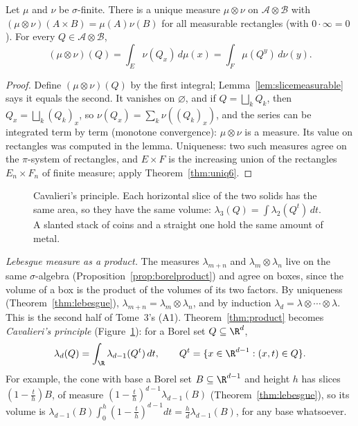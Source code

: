 \begin{theorem}\label{thm:product}
Let $\mu$ and $\nu$ be $\sigma$-finite. There is a unique measure $\mu\otimes\nu$ on $\mathcal A\otimes\mathcal B$ with $(\mu\otimes\nu)(A\times B)=\mu(A)\nu(B)$ for all measurable rectangles (with $0\cdot\infty=0$). For every
$Q\in\mathcal A\otimes\mathcal B$,
\[(\mu\otimes\nu)(Q)=\int_E\nu(Q_x)\,d\mu(x)=\int_F\mu(Q^y)\,d\nu(y).\]
\end{theorem}
\begin{proof}
Define $(\mu\otimes\nu)(Q)$ by the first integral; Lemma~\ref{lem:slicemeasurable} says it equals the second. It vanishes on $\varnothing$, and if $Q=\bigsqcup_kQ_k$, then $Q_x=\bigsqcup_k(Q_k)_x$, so
$\nu(Q_x)=\sum_k\nu((Q_k)_x)$, and the series can be integrated term by term (monotone convergence): $\mu\otimes\nu$ is a measure. Its value on rectangles was computed in the lemma. Uniqueness: two such
measures agree on the $\pi$-system of rectangles, and $E\times F$ is the increasing union of the rectangles $E_n\times F_n$ of finite measure; apply Theorem~\ref{thm:uniq6}.
\end{proof}

\begin{figure}[ht]
\centering
{}
\caption{Cavalieri's principle. Each horizontal slice of the two solids has the same area, so they have the same volume:
$\lambda_3(Q)=\int\lambda_2(Q^t)\,dt$. A slanted stack of coins and a straight one hold the same amount of metal.}
\label{fig:cavalieri}
\end{figure}

\emph{Lebesgue measure as a product.} The measures $\lambda_{m+n}$ and $\lambda_m\otimes\lambda_n$ live on the same $\sigma$-algebra (Proposition~\ref{prop:borelproduct}) and agree on boxes, since the volume of a box is the
product of the volumes of its two factors. By uniqueness (Theorem~\ref{thm:lebesgue}), $\lambda_{m+n}=\lambda_m\otimes\lambda_n$, and by induction $\lambda_d=\lambda\otimes\cdots\otimes\lambda$. This is the second
half of Tome~3's (A1). Theorem~\ref{thm:product} becomes \emph{Cavalieri's principle} (Figure~\ref{fig:cavalieri}): for a Borel set $Q\subseteq\R^d$,
\[\lambda_d(Q)=\int_\R\lambda_{d-1}(Q^t)\,dt,\qquad Q^t=\{x\in\R^{d-1}:(x,t)\in Q\}.\]
For example, the cone with base a Borel set $B\subseteq\R^{d-1}$ and height $h$ has slices $(1-\frac th)B$, of measure $(1-\frac th)^{d-1}\lambda_{d-1}(B)$ (Theorem~\ref{thm:lebesgue}), so its volume is
$\lambda_{d-1}(B)\int_0^h(1-\frac th)^{d-1}dt=\frac hd\lambda_{d-1}(B)$, for any base whatsoever.

